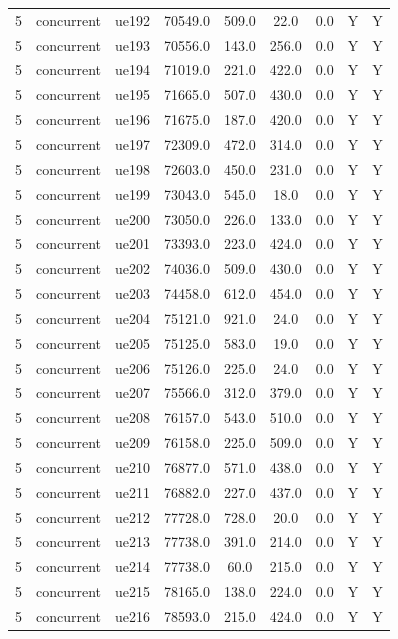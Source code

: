 \begin{table}[ht]
\begin{tabular}{|c|c|c|c|c|c|c|c|c|}
5 & concurrent & ue192 & 70549.0 & 509.0 & 22.0 & 0.0 & Y & Y \\
5 & concurrent & ue193 & 70556.0 & 143.0 & 256.0 & 0.0 & Y & Y \\
5 & concurrent & ue194 & 71019.0 & 221.0 & 422.0 & 0.0 & Y & Y \\
5 & concurrent & ue195 & 71665.0 & 507.0 & 430.0 & 0.0 & Y & Y \\
5 & concurrent & ue196 & 71675.0 & 187.0 & 420.0 & 0.0 & Y & Y \\
5 & concurrent & ue197 & 72309.0 & 472.0 & 314.0 & 0.0 & Y & Y \\
5 & concurrent & ue198 & 72603.0 & 450.0 & 231.0 & 0.0 & Y & Y \\
5 & concurrent & ue199 & 73043.0 & 545.0 & 18.0 & 0.0 & Y & Y \\
5 & concurrent & ue200 & 73050.0 & 226.0 & 133.0 & 0.0 & Y & Y \\
5 & concurrent & ue201 & 73393.0 & 223.0 & 424.0 & 0.0 & Y & Y \\
5 & concurrent & ue202 & 74036.0 & 509.0 & 430.0 & 0.0 & Y & Y \\
5 & concurrent & ue203 & 74458.0 & 612.0 & 454.0 & 0.0 & Y & Y \\
5 & concurrent & ue204 & 75121.0 & 921.0 & 24.0 & 0.0 & Y & Y \\
5 & concurrent & ue205 & 75125.0 & 583.0 & 19.0 & 0.0 & Y & Y \\
5 & concurrent & ue206 & 75126.0 & 225.0 & 24.0 & 0.0 & Y & Y \\
5 & concurrent & ue207 & 75566.0 & 312.0 & 379.0 & 0.0 & Y & Y \\
5 & concurrent & ue208 & 76157.0 & 543.0 & 510.0 & 0.0 & Y & Y \\
5 & concurrent & ue209 & 76158.0 & 225.0 & 509.0 & 0.0 & Y & Y \\
5 & concurrent & ue210 & 76877.0 & 571.0 & 438.0 & 0.0 & Y & Y \\
5 & concurrent & ue211 & 76882.0 & 227.0 & 437.0 & 0.0 & Y & Y \\
5 & concurrent & ue212 & 77728.0 & 728.0 & 20.0 & 0.0 & Y & Y \\
5 & concurrent & ue213 & 77738.0 & 391.0 & 214.0 & 0.0 & Y & Y \\
5 & concurrent & ue214 & 77738.0 & 60.0 & 215.0 & 0.0 & Y & Y \\
5 & concurrent & ue215 & 78165.0 & 138.0 & 224.0 & 0.0 & Y & Y \\
5 & concurrent & ue216 & 78593.0 & 215.0 & 424.0 & 0.0 & Y & Y \\

\end{tabular}
\end{table}
